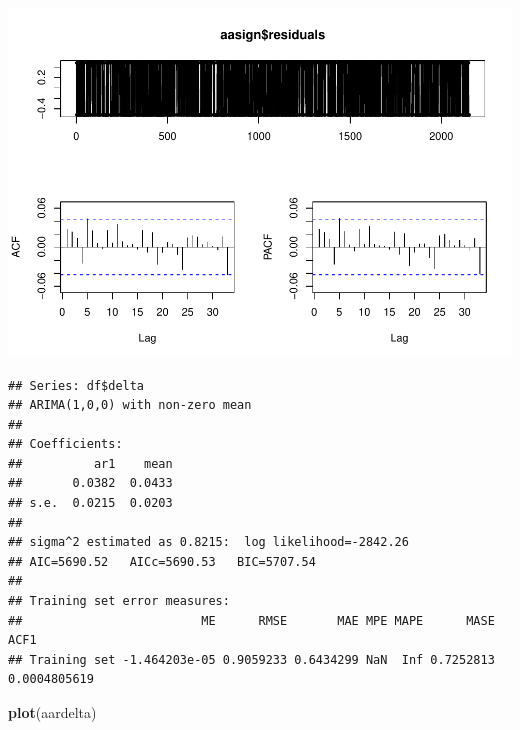 \documentclass[11pt, a4paper]{report}
\newenvironment{Shaded}{\begin{snugshade}}{\end{snugshade}}
\newcommand{\DataTypeTok}[1]{\textcolor[rgb]{0.13,0.29,0.53}{#1}}
\newcommand{\DecValTok}[1]{\textcolor[rgb]{0.00,0.00,0.81}{#1}}
\newcommand{\KeywordTok}[1]{\textcolor[rgb]{0.13,0.29,0.53}{\textbf{#1}}}
\newcommand{\NormalTok}[1]{#1}
\newcommand{\OperatorTok}[1]{\textcolor[rgb]{0.81,0.36,0.00}{\textbf{#1}}}
\newcommand{\StringTok}[1]{\textcolor[rgb]{0.31,0.60,0.02}{#1}}
\theoremstyle{plain}
\theoremstyle{plain}
\theoremstyle{remark}
\begin{document}
\begin{center}\includegraphics{Econo2_P1_files/figure-latex/auto arima-6} \end{center}

\begin{Shaded}
\end{Shaded}

\begin{verbatim}
## Series: df$delta 
## ARIMA(1,0,0) with non-zero mean 
## 
## Coefficients:
##          ar1    mean
##       0.0382  0.0433
## s.e.  0.0215  0.0203
## 
## sigma^2 estimated as 0.8215:  log likelihood=-2842.26
## AIC=5690.52   AICc=5690.53   BIC=5707.54
## 
## Training set error measures:
##                         ME      RMSE       MAE MPE MAPE      MASE         ACF1
## Training set -1.464203e-05 0.9059233 0.6434299 NaN  Inf 0.7252813 0.0004805619
\end{verbatim}

\begin{Shaded}
\begin{Highlighting}[]
\KeywordTok{plot}\NormalTok{(aardelta)}
\end{Highlighting}
\end{Shaded}
\end{document}
